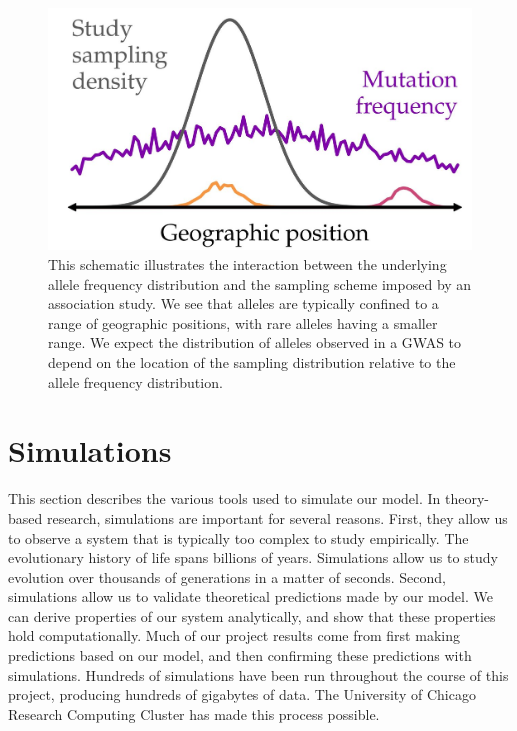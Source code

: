 \begin{figure}[h]
    \centering
    \includegraphics[scale=0.4]{img/smapling_schematic.JPG}
    \caption{This schematic illustrates the interaction between the underlying allele frequency distribution and the sampling scheme imposed by an association study. We see that alleles are typically confined to a range of geographic positions, with rare alleles having a smaller range. We expect the distribution of alleles observed in a GWAS to depend on the location of the sampling distribution relative to the allele frequency distribution.}
    \label{fig:sampling_schematic}
\end{figure}

\newpage
\section{Simulations}

This section describes the various tools used to simulate our model. In theory-based research, simulations are important for several reasons. First, they allow us to observe a system that is typically too complex to study empirically. The evolutionary history of life spans billions of years. Simulations allow us to study evolution over thousands of generations in a matter of seconds. Second, simulations allow us to validate theoretical predictions made by our model. We can derive properties of our system analytically, and show that these properties hold computationally. Much of our project results come from first making predictions based on our model, and then confirming these predictions with simulations. Hundreds of simulations have been run throughout the course of this project, producing hundreds of gigabytes of data. The University of Chicago Research Computing Cluster has made this process possible.


